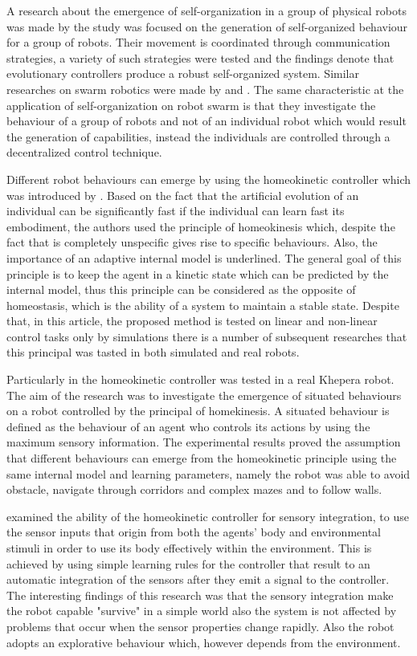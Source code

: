 \documentclass[msc,ai,logo]{infthesis}
\begin{document}
A research about the emergence of self-organization in a group of physical robots was made by \cite{Trianni} the study was focused on the generation of self-organized behaviour for a group of robots. Their movement is coordinated through communication strategies, a variety of such strategies were tested and the findings denote that evolutionary controllers produce a robust self-organized system. Similar researches on swarm robotics were made by \cite{Svennebring} and \cite{Nuyan}. The same characteristic at the application of self-organization on robot swarm is that they investigate the behaviour of a group of robots and not of an individual robot which would result the generation of capabilities, instead the individuals are controlled through a decentralized control technique.       

Different robot behaviours can emerge by using the homeokinetic controller which was introduced by \cite{dersteinpas99}. Based on the fact that the artificial evolution of an individual can be significantly fast if the individual can learn fast its embodiment, the authors used the principle of homeokinesis which, despite the fact that is completely unspecific gives rise to specific behaviours. Also, the importance of an adaptive internal model is underlined. The general goal of this principle is to keep the agent in a kinetic state which can be predicted by the internal model, thus this principle can be considered as the opposite of homeostasis, which is the ability of a system to maintain a stable state. Despite that, in this article, the proposed method is tested on linear and non-linear control tasks only by simulations there is a number of subsequent researches that this principal was tasted in both simulated and real robots.

Particularly in \cite{der01} the homeokinetic controller was tested in a real Khepera robot. The aim of the research was to investigate the emergence of situated behaviours on a robot controlled by the principal of homekinesis. A situated behaviour is defined as the behaviour of an agent who controls its actions by using the maximum sensory information. The experimental results proved the assumption that different behaviours can emerge from the homeokinetic principle using the same internal model and learning parameters, namely the robot was able to avoid obstacle, navigate through corridors and complex mazes and to follow walls.

\cite{derhesselieb04} examined the ability of the homeokinetic controller for sensory integration, to use the sensor inputs that origin from both the agents' body and environmental stimuli in order to use its body effectively within the environment. This is achieved by using simple learning rules for the controller that result to an automatic integration of the sensors after they emit a signal to the controller. The interesting findings of this research was that the sensory integration make the robot capable "survive" in a simple world also the system is not affected by problems that occur when the sensor properties change rapidly. Also the robot adopts an explorative behaviour which, however depends from the environment. 
\end{document}
